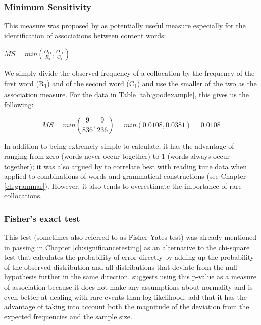 \subsubsection{Minimum Sensitivity}
\label{sec:amminimumsensitivity}

This measure was proposed by \citet{pedersen_dependent_1998} as potentially useful measure especially for the identification of associations between content words:

\begin{exe}
\ex $\displaystyle{MS = {min} \left ( \frac{O_{11}}{R_1},\frac{O_{11}}{C_1} \right )}$ 
\label{ex:minsens}
\end{exe}

We simply divide the observed frequency of a collocation by the frequency of the first word (R\textsubscript{1}) and of the second word (C\textsubscript{1}) and use the smaller of the two as the association measure. For the data in Table \ref{tab:goodexample}, this gives us the following:

$$MS = min \left( \frac{9}{836}, \frac{9}{236} \right) = min \left( 0.0108,0.0381 \right) = 0.0108$$

In addition to being extremely simple to calculate, it has the advantage of ranging from zero (words never occur together) to 1 (words always occur together); it was also argued by \citet{wiechmann_computation_2008} to correlate best with reading time data when applied to combinations of words and grammatical constructions (see Chapter \ref{ch:grammar}). However, it also tends to overestimate the importance of rare collocations.

\subsubsection{Fisher's exact test}
\label{sec:amfishersexacttest}

This test (sometimes also referred to as Fisher-Yates test) was already mentioned in passing in Chapter \ref{ch:significancetesting} as an alternative to the chi-square test that calculates the probability of error directly by adding up the probability of the observed distribution and all distributions that deviate from the null hypothesis further in the same direction. \citet{pedersen_fishing_1996} suggests using this p-value as a measure of association because it does not make any assumptions about normality and is even better at dealing with rare events than log-likelihood. \citet[238--239]{stefanowitsch_collostructions:_2003} add that it has the advantage of taking into account both the magnitude of the deviation from the expected frequencies and the sample size.

